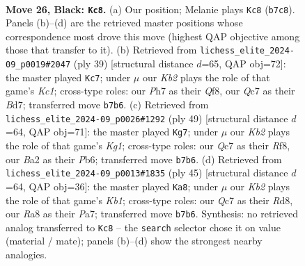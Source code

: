 \documentclass[11pt]{article}
\begin{document}
\clearpage

\begin{figure}[p]\centering
\begin{subfigure}{0.46\textwidth}\centering
\resizebox{\linewidth}{!}{%
\newchessgame
\chessboard[
  setfen={r6r/pkq2p1p/2pQ4/2N5/3p4/3P4/b4PPP/2R3K1 b - - 11 26},
  showmover=false,
  pgfstyle=straightmove, color=movearrow, markmove={b7-c8}
]}
\caption{}
\end{subfigure}\hfill
\begin{subfigure}{0.46\textwidth}\centering
\resizebox{\linewidth}{!}{%
\newchessgame
\chessboard[
  setfen={r1k2q1r/pp1bNp1p/5Qp1/8/8/8/PPP2PPP/2K1R3 b - - 2 20},
  showmover=false,
  pgfstyle=straightmove, color=movearrow, markmove={c8-c7}
]}
\caption{}
\end{subfigure}
\\[4pt]
\begin{subfigure}{0.46\textwidth}\centering
\resizebox{\linewidth}{!}{%
\newchessgame
\chessboard[
  setfen={5rk1/pq2Np2/1p3p1p/1Bpr4/8/1P6/P1Q2PPK/4R3 b - - 1 25},
  showmover=false,
  pgfstyle=straightmove, color=movearrow, markmove={g8-g7}
]}
\caption{}
\end{subfigure}\hfill
\begin{subfigure}{0.46\textwidth}\centering
\resizebox{\linewidth}{!}{%
\newchessgame
\chessboard[
  setfen={1k1r3r/pp1qNbp1/7p/8/2Pp1Q2/3B4/P1P3PP/4R1K1 b - - 2 23},
  showmover=false,
  pgfstyle=straightmove, color=movearrow, markmove={b8-a8}
]}
\caption{}
\end{subfigure}
\caption{\textbf{Move 26, Black: \texttt{Kc8}.} (a) Our position; Melanie plays \texttt{Kc8} (\texttt{b7c8}). Panels (b)--(d) are the retrieved master positions whose correspondence most drove this move (highest QAP objective among those that transfer to it). (b) Retrieved from \texttt{lichess\_elite\_2024-09\_p0019\#2047} (ply 39) [structural distance $d$=65, QAP obj=72]: the master played \texttt{Kc7}; under $\mu$ our \emph{Kb2} plays the role of that game's \emph{Kc1}; cross-type roles: our \emph{P}h7 as their \emph{Q}f8, our \emph{Q}c7 as their \emph{B}d7; transferred move \texttt{b7b6}. (c) Retrieved from \texttt{lichess\_elite\_2024-09\_p0026\#1292} (ply 49) [structural distance $d$=64, QAP obj=71]: the master played \texttt{Kg7}; under $\mu$ our \emph{Kb2} plays the role of that game's \emph{Kg1}; cross-type roles: our \emph{Q}c7 as their \emph{R}f8, our \emph{B}a2 as their \emph{P}b6; transferred move \texttt{b7b6}. (d) Retrieved from \texttt{lichess\_elite\_2024-09\_p0013\#1835} (ply 45) [structural distance $d$=64, QAP obj=36]: the master played \texttt{Ka8}; under $\mu$ our \emph{Kb2} plays the role of that game's \emph{Kb1}; cross-type roles: our \emph{Q}c7 as their \emph{R}d8, our \emph{R}a8 as their \emph{P}a7; transferred move \texttt{b7b6}. Synthesis: no retrieved analog transferred to \texttt{Kc8} -- the \texttt{search} selector chose it on value (material / mate); panels (b)--(d) show the strongest nearby analogies.}
\label{fig:thought-m51}
\end{figure}
\end{document}
